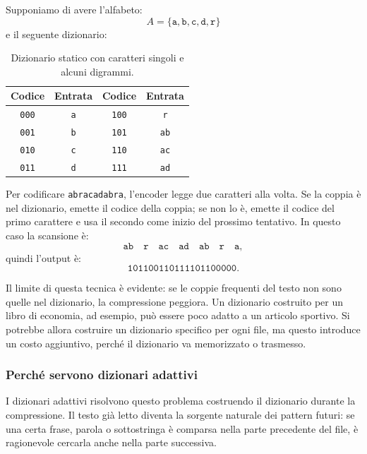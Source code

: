 \documentclass{article}
\theoremstyle{definition}
\numberwithin{equation}{section}
\begin{document}
Supponiamo di avere l'alfabeto:
\[
    A=\{\texttt{a},\texttt{b},\texttt{c},\texttt{d},\texttt{r}\}
\]
e il seguente dizionario:
\begin{table}[htpb]
    \centering
    \begin{tabular}{c|c||c|c}
        \textbf{Codice} & \textbf{Entrata} & \textbf{Codice} & \textbf{Entrata} \\ \hline
        \texttt{000}    & \texttt{a}       & \texttt{100}    & \texttt{r}       \\
        \texttt{001}    & \texttt{b}       & \texttt{101}    & \texttt{ab}      \\
        \texttt{010}    & \texttt{c}       & \texttt{110}    & \texttt{ac}      \\
        \texttt{011}    & \texttt{d}       & \texttt{111}    & \texttt{ad}
    \end{tabular}
    \caption{Dizionario statico con caratteri singoli e alcuni digrammi.}
    \label{tab:static_digram_dictionary}
\end{table}

Per codificare \texttt{abracadabra}, l'encoder legge due caratteri alla volta. Se la coppia è nel dizionario, emette il codice della coppia; se non lo è, emette il codice del primo carattere e usa il secondo come inizio del prossimo tentativo. In questo caso la scansione è:
\[
    \texttt{ab}\quad \texttt{r}\quad \texttt{ac}\quad \texttt{ad}\quad
    \texttt{ab}\quad \texttt{r}\quad \texttt{a},
\]
quindi l'output è:
\[
    \texttt{101100110111101100000}.
\]

Il limite di questa tecnica è evidente: se le coppie frequenti del testo non sono quelle nel dizionario, la compressione peggiora. Un dizionario costruito per un libro di economia, ad esempio, può essere poco adatto a un articolo sportivo. Si potrebbe allora costruire un dizionario specifico per ogni file, ma questo introduce un costo aggiuntivo, perché il dizionario va memorizzato o trasmesso.

\subsubsection{Perché servono dizionari adattivi}
I dizionari adattivi risolvono questo problema costruendo il dizionario durante la compressione. Il testo già letto diventa la sorgente naturale dei pattern futuri: se una certa frase, parola o sottostringa è comparsa nella parte precedente del file, è ragionevole cercarla anche nella parte successiva.
\end{document}
